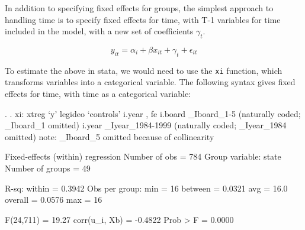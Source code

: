 \documentclass[12pt]{article}
\begin{document}
In addition to specifying fixed effects for groups, the simplest
approach to handling time is to specify fixed effects for time, with
T-1 variables for time included in the model, with a new set of
coefficients $\gamma_t$. 

\begin{equation*}
  \label{eq:fe-time}
  y_{it}=\alpha_i+ \beta x_{it} + \gamma_t + \epsilon_{it}
\end{equation*}

To estimate the above in stata, we would need to use the \texttt{xi}
function, which transforms variables into a categorical variable. The
following syntax gives fixed effects for time, with time as a
categorical variable:

\begin{stlog}
  . 
. xi: xtreg `y' legideo   `controls' i.year , fe
i.board           _Iboard_1-5         (naturally coded; _Iboard_1 omitted)
i.year            _Iyear_1984-1999    (naturally coded; _Iyear_1984 omitted)
note: _Iboard_5 omitted because of collinearity

Fixed-effects (within) regression               Number of obs      =       784
Group variable: state                           Number of groups   =        49

R-sq:  within  = 0.3942                         Obs per group: min =        16
       between = 0.0321                                        avg =      16.0
       overall = 0.0576                                        max =        16

                                                F(24,711)          =     19.27
corr(u_i, Xb)  = -0.4822                        Prob > F           =    0.0000


\end{stlog}
\end{document}
